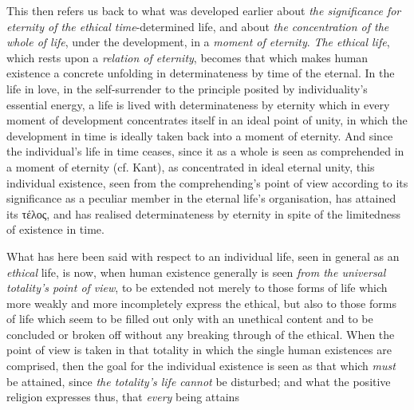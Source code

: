 \documentclass[12pt,a4paper]{book}
\begin{document}
This then refers us back to what was developed earlier about \emph{the
significance for eternity of the ethical time}-determined life, and about
\emph{the concentration of the whole of life}, under the development, in a
\emph{moment of eternity}. \emph{The ethical life}, which rests upon a
\emph{relation of eternity}, becomes that which makes human existence a concrete
unfolding in determinateness by time of the eternal. In the life in love, in the
self-surrender to the principle posited by individuality's essential energy, a
life is lived with determinateness by eternity which in every moment of
development concentrates itself in an ideal point of unity, in which the
development in time is ideally taken back into a moment of eternity. And since
the individual's life in time ceases, since it as a whole is seen as comprehended
in a moment of eternity (cf. Kant), as concentrated in ideal eternal unity, this
individual existence, seen from the comprehending's point of view according to
its significance as a peculiar member in the eternal life's organisation, has
attained its τέλος, and has realised determinateness by eternity in spite of the
limitedness of existence in time.

What has here been said with respect to an individual life, seen in general as
an \emph{ethical} life, is now, when human existence generally is seen
\emph{from the universal totality's point of view}, to be extended not merely to
those forms of life which more weakly and more incompletely express the ethical,
but also to those forms of life which seem to be filled out only with an
unethical content and to be concluded or broken off without any breaking through
of the ethical. When the point of view is taken in that totality in which the
single human existences are comprised, then the goal for the individual
existence is seen as that which \emph{must} be attained, since \emph{the
totality's life cannot} be disturbed; and what the positive religion expresses
thus, that \emph{every} being attains
\end{document}
